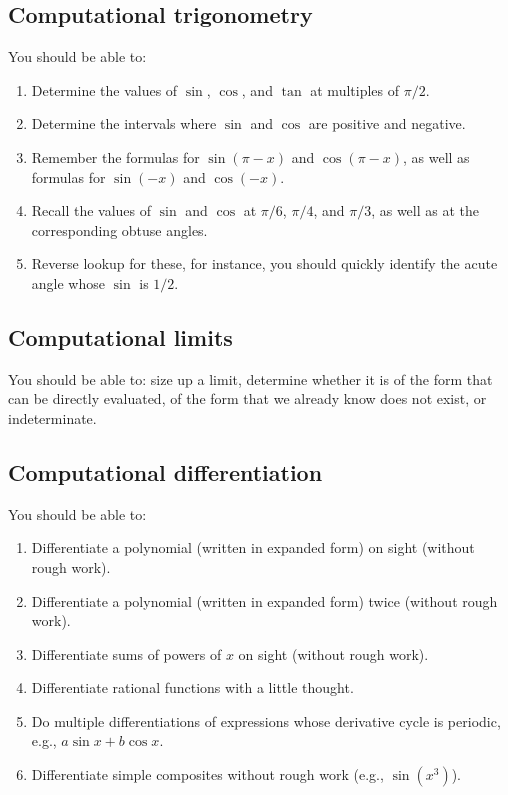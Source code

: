 \documentclass[10pt]{amsart}
\begin{document}
\subsection{Computational trigonometry}

You should be able to:

\begin{enumerate}
\item Determine the values of $\sin$, $\cos$, and $\tan$ at multiples
  of $\pi/2$.
\item Determine the intervals where $\sin$ and $\cos$ are positive and
  negative.
\item Remember the formulas for $\sin(\pi - x)$ and $\cos(\pi - x)$,
as well as formulas for $\sin(-x)$ and $\cos(-x)$.
\item Recall the values of $\sin$ and $\cos$ at $\pi/6$, $\pi/4$, and
  $\pi/3$, as well as at the corresponding obtuse angles.
\item Reverse lookup for these, for instance, you should quickly
  identify the acute angle whose $\sin$ is $1/2$.
\end{enumerate}

\subsection{Computational limits}

You should be able to: size up a limit, determine whether it is of the
form that can be directly evaluated, of the form that we already know
does not exist, or indeterminate.

\subsection{Computational differentiation}

You should be able to:

\begin{enumerate}
\item Differentiate a polynomial (written in expanded form) on sight
  (without rough work).
\item Differentiate a polynomial (written in expanded form) twice
  (without rough work).
\item Differentiate sums of powers of $x$ on sight (without rough
  work).
\item Differentiate rational functions with a little thought.
\item Do multiple differentiations of expressions whose derivative
  cycle is periodic, e.g., $a \sin x + b \cos x$.
\item Differentiate simple composites without rough work (e.g.,
  $\sin(x^3)$).
\end{enumerate}
\end{document}

